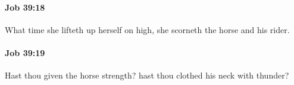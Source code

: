 		\paragraph{Job 39:18} %
			\label{JOB-39-18}

			What time she lifteth up herself on high, she scorneth the horse and his rider.


		\paragraph{Job 39:19} %
			\label{JOB-39-19}

			Hast thou given the horse strength? hast thou clothed his neck with thunder?


